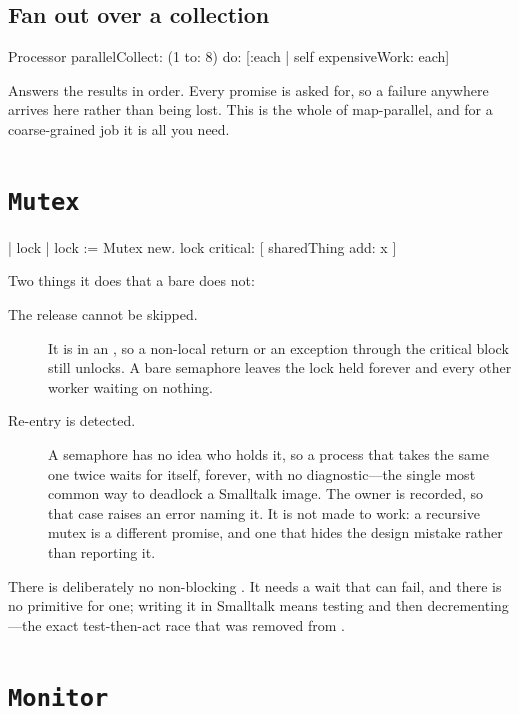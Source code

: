 \subsection{Fan out over a collection}

\begin{st}
Processor parallelCollect: (1 to: 8) do: [:each | self expensiveWork: each]
\end{st}

Answers the results in order. Every promise is asked for, so a failure
anywhere arrives here rather than being lost. This is the whole of
map-parallel, and for a coarse-grained job it is all you need.

\section{\texttt{Mutex}}

\begin{st}
| lock |
lock := Mutex new.
lock critical: [ sharedThing add: x ]
\end{st}

Two things it does that a bare  does not:

\begin{description}
\item[The release cannot be skipped.] It is in an , so a non-local
  return or an exception through the critical block still unlocks. A bare
  semaphore leaves the lock held forever and every other worker waiting on
  nothing.
\item[Re-entry is detected.] A semaphore has no idea who holds it, so a
  process that takes the same one twice waits for itself, forever, with no
  diagnostic---the single most common way to deadlock a Smalltalk image. The
  owner is recorded, so that case raises an error naming it. It is not made to
  work: a recursive mutex is a different promise, and one that hides the design
  mistake rather than reporting it.
\end{description}

\begin{stnote}
There is deliberately no non-blocking . It needs a wait that
can fail, and there is no primitive for one; writing it in Smalltalk means
testing  and then decrementing---the exact test-then-act race
that was removed from .
\end{stnote}

\section{\texttt{Monitor}}

